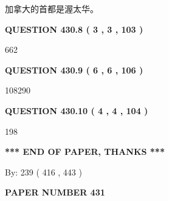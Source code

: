 \documentclass{ctexart}
\begin{document}
 
加拿大的首都是渥太华。
 
 
 
 
  
\vspace{0.2in}
  
{\textbf{\Large{QUESTION
430.8 
 ( 3 , 3 , 103 )
}}}
  
  
 
 
\noindent{}

662
 
 
  
\vspace{0.2in}
  
{\textbf{\Large{QUESTION
430.9 
 ( 6 , 6 , 106 )
}}}
  
  
 
 
\noindent{}

108290
 
 
  
\vspace{0.2in}
  
{\textbf{\Large{QUESTION
430.10 
 ( 4 , 4 , 104 )
}}}
  
  
 
 
\noindent{}

198
 
 
   
   
 \vspace{0.2in}
 
   
   
   
   
\vspace{1.0in} 
{\textbf{\large{ *** END OF PAPER, THANKS *** }}} 
   
   
\hspace{1.0in} By: 
 239 ( 416 ,  443 )
   
   
   
   
\newpage 
\setcounter{page}{ 
   431001 } 
   
   
   
   
 {\textbf{ \Large{ PAPER NUMBER  431  }}}
   
   
\vspace{0.2in}
   
   
   
\end{document}
